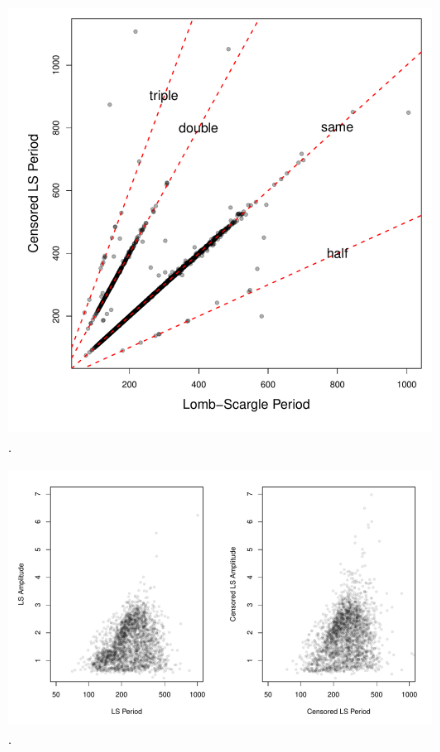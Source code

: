 \documentclass[12pt,preprint]{aastex}
\begin{document}
\clearpage
\begin{figure}
\begin{center}
\includegraphics[angle=0,width=6.5in]{../plots/mira_periods_LS_vs_Censored.pdf}
\end{center}
\caption{ .  \label{fig:miraP}}
\end{figure}

\clearpage
\begin{figure}
\begin{center}
\includegraphics[angle=0,width=6.5in]{../plots/mira_period_amplitude_relation.pdf}
\end{center}
\caption{ .  \label{fig:miraPA}}
\end{figure}
\end{document}
